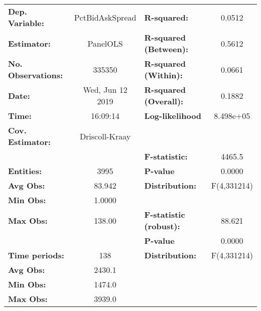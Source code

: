 \begin{center}
\begin{tabular}{lclc}
\toprule
\textbf{Dep. Variable:}                 &  PctBidAskSpread   & \textbf{  R-squared:         }   &      0.0512      \\
\textbf{Estimator:}                     &      PanelOLS      & \textbf{  R-squared (Between):}  &      0.5612      \\
\textbf{No. Observations:}              &       335350       & \textbf{  R-squared (Within):}   &      0.0661      \\
\textbf{Date:}                          &  Wed, Jun 12 2019  & \textbf{  R-squared (Overall):}  &      0.1882      \\
\textbf{Time:}                          &      16:09:14      & \textbf{  Log-likelihood     }   &    8.498e+05     \\
\textbf{Cov. Estimator:}                &   Driscoll-Kraay   & \textbf{                     }   &                  \\
\textbf{}                               &                    & \textbf{  F-statistic:       }   &      4465.5      \\
\textbf{Entities:}                      &        3995        & \textbf{  P-value            }   &      0.0000      \\
\textbf{Avg Obs:}                       &       83.942       & \textbf{  Distribution:      }   &   F(4,331214)    \\
\textbf{Min Obs:}                       &       1.0000       & \textbf{                     }   &                  \\
\textbf{Max Obs:}                       &       138.00       & \textbf{  F-statistic (robust):} &      88.621      \\
\textbf{}                               &                    & \textbf{  P-value            }   &      0.0000      \\
\textbf{Time periods:}                  &        138         & \textbf{  Distribution:      }   &   F(4,331214)    \\
\textbf{Avg Obs:}                       &       2430.1       & \textbf{                     }   &                  \\
\textbf{Min Obs:}                       &       1474.0       & \textbf{                     }   &                  \\
\textbf{Max Obs:}                       &       3939.0       & \textbf{                     }   &                  \\

\end{tabular}
\end{center}
